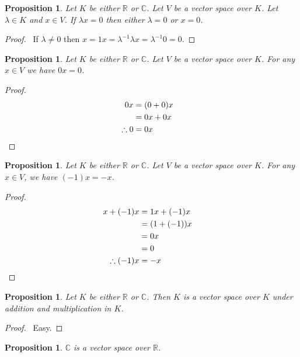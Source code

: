 \documentclass{book}
\let\qed\relax
\newtheorem{prop}[ax]{Proposition}
\theoremstyle{definition}
\begin{document}
\begin{prop}
Let $K$ be either $\mathbb{R}$ or $\mathbb{C}$. Let $V$ be a vector space over $K$. Let $\lambda \in K$ and $x \in V$. If $\lambda x = 0$ then either $\lambda = 0$ or $x = 0$.
\end{prop}

\begin{proof}
\pf\ If $\lambda \neq 0$ then $x = 1x = \lambda^{-1} \lambda x = \lambda^{-1} 0 = 0$. \qed
\end{proof}

\begin{prop}
\label{prop:zerotimes}
Let $K$ be either $\mathbb{R}$ or $\mathbb{C}$. Let $V$ be a vector space over $K$. For any $x \in V$ we have $0x = 0$.
\end{prop}

\begin{proof}
\pf
\begin{align*}
0x & = (0 + 0) x \\
& = 0x + 0x \\
\therefore 0 & = 0x & \qed
\end{align*}
\end{proof}

\begin{prop}
Let $K$ be either $\mathbb{R}$ or $\mathbb{C}$. Let $V$ be a vector space over $K$. For any $x \in V$, we have $(-1)x = -x$.
\end{prop}

\begin{proof}
\pf
\begin{align*}
x + (-1)x & = 1x + (-1) x \\
& = (1 + (-1))x \\
& = 0 x \\
& = 0 \\
\therefore (-1)x & = -x & \qed
\end{align*}
\end{proof}

\begin{prop}
Let $K$ be either $\mathbb{R}$ or $\mathbb{C}$. Then $K$ is a vector space over $K$ under addition and multiplication in $K$.
\end{prop}

\begin{proof}
\pf\ Easy. \qed
\end{proof}

\begin{prop}
$\mathbb{C}$ is a vector space over $\mathbb{R}$.
\end{prop}
\end{document}
